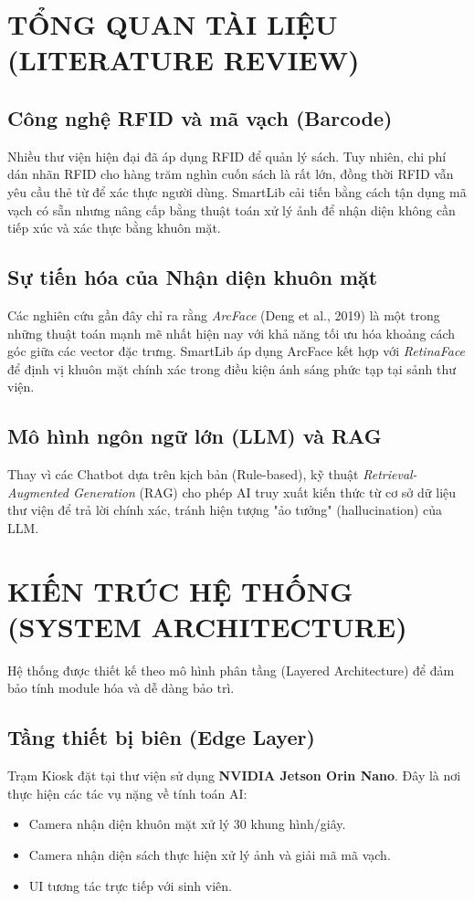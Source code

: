 \documentclass[12pt,a4paper]{article}
\begin{document}
\section{TỔNG QUAN TÀI LIỆU (LITERATURE REVIEW)}

\subsection{Công nghệ RFID và mã vạch (Barcode)}
Nhiều thư viện hiện đại đã áp dụng RFID để quản lý sách. Tuy nhiên, chi phí dán nhãn RFID cho hàng trăm nghìn cuốn sách là rất lớn, đồng thời RFID vẫn yêu cầu thẻ từ để xác thực người dùng. SmartLib cải tiến bằng cách tận dụng mã vạch có sẵn nhưng nâng cấp bằng thuật toán xử lý ảnh để nhận diện không cần tiếp xúc và xác thực bằng khuôn mặt.

\subsection{Sự tiến hóa của Nhận diện khuôn mặt}
Các nghiên cứu gần đây chỉ ra rằng \textit{ArcFace} (Deng et al., 2019) là một trong những thuật toán mạnh mẽ nhất hiện nay với khả năng tối ưu hóa khoảng cách góc giữa các vector đặc trưng. SmartLib áp dụng ArcFace kết hợp với \textit{RetinaFace} để định vị khuôn mặt chính xác trong điều kiện ánh sáng phức tạp tại sảnh thư viện.

\subsection{Mô hình ngôn ngữ lớn (LLM) và RAG}
Thay vì các Chatbot dựa trên kịch bản (Rule-based), kỹ thuật \textit{Retrieval-Augmented Generation} (RAG) cho phép AI truy xuất kiến thức từ cơ sở dữ liệu thư viện để trả lời chính xác, tránh hiện tượng "ảo tưởng" (hallucination) của LLM.

\section{KIẾN TRÚC HỆ THỐNG (SYSTEM ARCHITECTURE)}

Hệ thống được thiết kế theo mô hình phân tầng (Layered Architecture) để đảm bảo tính module hóa và dễ dàng bảo trì.

\subsection{Tầng thiết bị biên (Edge Layer)}
Trạm Kiosk đặt tại thư viện sử dụng \textbf{NVIDIA Jetson Orin Nano}. Đây là nơi thực hiện các tác vụ nặng về tính toán AI:
\begin{itemize}
    \item Camera nhận diện khuôn mặt xử lý 30 khung hình/giây.
    \item Camera nhận diện sách thực hiện xử lý ảnh và giải mã mã vạch.
    \item UI tương tác trực tiếp với sinh viên.
\end{itemize}
\end{document}
